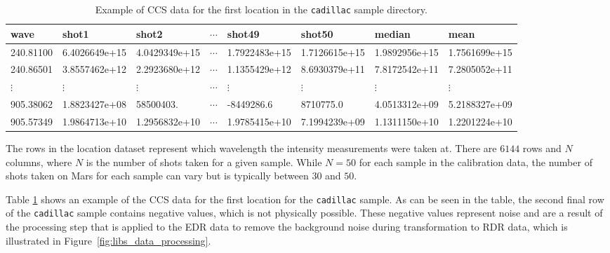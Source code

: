 \begin{table}[!b]
\centering
\begin{tabular}{llllllll}
\toprule
     wave &         shot1 &         shot2 &  $\cdots$ &        shot49 &       shot50  & median        & mean          \\
\midrule
240.81100 & 6.4026649e+15 & 4.0429349e+15 & $\cdots$  & 1.7922483e+15 & 1.7126615e+15 & 1.9892956e+15 & 1.7561699e+15 \\
240.86501 & 3.8557462e+12 & 2.2923680e+12 & $\cdots$  & 1.1355429e+12 & 8.6930379e+11 & 7.8172542e+11 & 7.2805052e+11 \\
$\vdots$  & $\vdots$      & $\vdots$      & $\cdots$  & $\vdots$      & $\vdots$      & $\vdots$      & $\vdots$      \\
905.38062 & 1.8823427e+08 & 58500403.     & $\cdots$  & -8449286.6    & 8710775.0     & 4.0513312e+09 & 5.2188327e+09 \\
905.57349 & 1.9864713e+10 & 1.2956832e+10 & $\cdots$  & 1.9785415e+10 & 7.1994239e+09 & 1.1311150e+10 & 1.2201224e+10 \\
\bottomrule
\end{tabular}
\caption{Example of CCS data for the first location in the \texttt{cadillac} sample directory.}
\label{tab:ccs_data_example}
\end{table}

The rows in the location dataset represent which wavelength the intensity measurements were taken at.
There are $6144$ rows and $N$ columns, where $N$ is the number of shots taken for a given sample.
While $N=50$ for each sample in the calibration data, the number of shots taken on Mars for each sample can vary but is typically between $30$ and $50$\cite{maurice_chemcam_2016}.

Table \ref{tab:ccs_data_example} shows an example of the CCS data for the first location for the \texttt{cadillac} sample.
As can be seen in the table, the second final row of the \texttt{cadillac} sample contains negative values, which is not physically possible.
These negative values represent noise and are a result of the processing step that is applied to the EDR data to remove the background noise during transformation to RDR data, which is illustrated in Figure~\ref{fig:libs_data_processing}.

